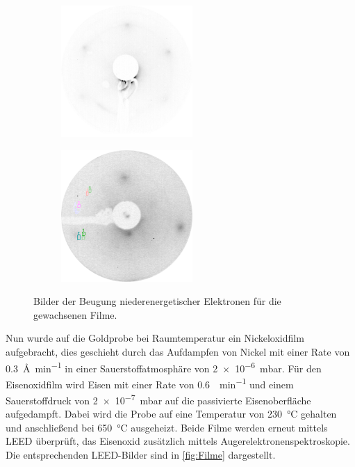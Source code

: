         \begin{figure}
            \centering
            \begin{subfigure}{0.48\textwidth}
                \centering
                \includegraphics[height=5cm]{./content/pictures/NiO/2021_06_15_019_NiO(111)_73eV_Thicklayer}
            \end{subfigure}
            \begin{subfigure}{0.48\textwidth}
                \centering
                \includegraphics[height=5cm]{./content/pictures/FeO/2021_09_09_001_FeO_125eV.png}
            \end{subfigure}
            \caption{Bilder der Beugung niederenergetischer Elektronen für die gewachsenen Filme.}
        \label{fig:Filme}
        \end{figure}
        Nun wurde auf die Goldprobe bei Raumtemperatur ein Nickeloxidfilm aufgebracht, dies geschieht durch das Aufdampfen von Nickel mit einer Rate von \SI{0.3}{\angstrom\per\minute} in einer Sauerstoffatmosphäre von \SI{2e-6}{\milli\bar}.
        Für den Eisenoxidfilm wird Eisen mit einer Rate von \SI{0.6}{\ML\per\minute} und einem Sauerstoffdruck von \SI{2e-7}{\milli\bar} auf die passivierte Eisenoberfläche aufgedampft.
        Dabei wird die Probe auf eine Temperatur von \SI{230}{\celsius} gehalten und anschließend bei \SI{650}{\celsius} ausgeheizt.
        Beide Filme werden erneut mittels LEED überprüft, das Eisenoxid zusätzlich mittels Augerelektronenspektroskopie.
        Die entsprechenden LEED-Bilder sind in \autoref{fig:Filme} dargestellt.

